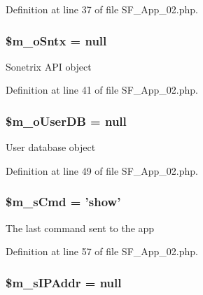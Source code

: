 Definition at line 37 of file SF\_\-App\_\-02.php.

\hypertarget{classSF__App__02_a22d1091f94c58e3533304abe3eb9e9fe}{
\subsubsection[{\$m\_\-oSntx}]{\setlength{\rightskip}{0pt plus 5cm}\$m\_\-oSntx = null}}
\label{classSF__App__02_a22d1091f94c58e3533304abe3eb9e9fe}
Sonetrix API object 

Definition at line 41 of file SF\_\-App\_\-02.php.

\hypertarget{classSF__App__02_a480a834e33015cc9a001d1d84972bb12}{
\subsubsection[{\$m\_\-oUserDB}]{\setlength{\rightskip}{0pt plus 5cm}\$m\_\-oUserDB = null}}
\label{classSF__App__02_a480a834e33015cc9a001d1d84972bb12}
User database object 

Definition at line 49 of file SF\_\-App\_\-02.php.

\hypertarget{classSF__App__02_a21ffd6ebc459ccba9514cbaee05b2ece}{
\subsubsection[{\$m\_\-sCmd}]{\setlength{\rightskip}{0pt plus 5cm}\$m\_\-sCmd = 'show'}}
\label{classSF__App__02_a21ffd6ebc459ccba9514cbaee05b2ece}
The last command sent to the app 

Definition at line 57 of file SF\_\-App\_\-02.php.

\hypertarget{classSF__App__02_a2db945fecc9d0f95e19093d7829be78d}{
\subsubsection[{\$m\_\-sIPAddr}]{\setlength{\rightskip}{0pt plus 5cm}\$m\_\-sIPAddr = null}}
\label{classSF__App__02_a2db945fecc9d0f95e19093d7829be78d}


